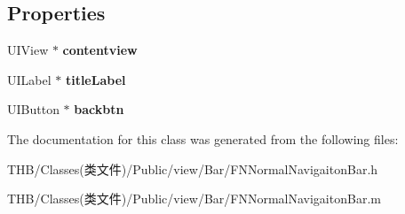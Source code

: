 \subsection*{Properties}
\begin{DoxyCompactItemize}
\item 
\mbox{\label{interface_f_n_normal_navigaiton_bar_a622ed88e15fa90250eb86eadfbcfda00}} 
U\+I\+View $\ast$ {\bfseries contentview}
\item 
\mbox{\label{interface_f_n_normal_navigaiton_bar_a92cbdbeaf39919eb0310560f23ab49e6}} 
U\+I\+Label $\ast$ {\bfseries title\+Label}
\item 
\mbox{\label{interface_f_n_normal_navigaiton_bar_ae0854276d846a4f77fa251d3250a30b5}} 
U\+I\+Button $\ast$ {\bfseries backbtn}
\end{DoxyCompactItemize}


The documentation for this class was generated from the following files\+:\begin{DoxyCompactItemize}
\item 
T\+H\+B/\+Classes(类文件)/\+Public/view/\+Bar/F\+N\+Normal\+Navigaiton\+Bar.\+h\item 
T\+H\+B/\+Classes(类文件)/\+Public/view/\+Bar/F\+N\+Normal\+Navigaiton\+Bar.\+m\end{DoxyCompactItemize}
